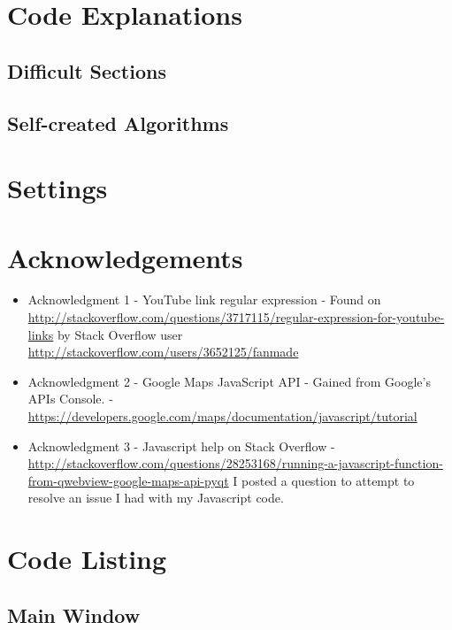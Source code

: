 \section{Code Explanations}

\subsection{Difficult Sections}

\subsection{Self-created Algorithms}

\section{Settings}






\section{Acknowledgements}

\begin{itemize}
\item Acknowledgment 1 - YouTube link regular expression - Found on \url{http://stackoverflow.com/questions/3717115/regular-expression-for-youtube-links} by Stack Overflow user \url{http://stackoverflow.com/users/3652125/fanmade}
\item Acknowledgment 2 - Google Maps JavaScript API - Gained from Google's APIs Console. - \url{https://developers.google.com/maps/documentation/javascript/tutorial}
\item Acknowledgment 3 - Javascript help on Stack Overflow - \url{http://stackoverflow.com/questions/28253168/running-a-javascript-function-from-qwebview-google-maps-api-pyqt} I posted a question to attempt to resolve an issue I had with my Javascript code.
\end{itemize}

\section{Code Listing}

\subsection{Main Window}

